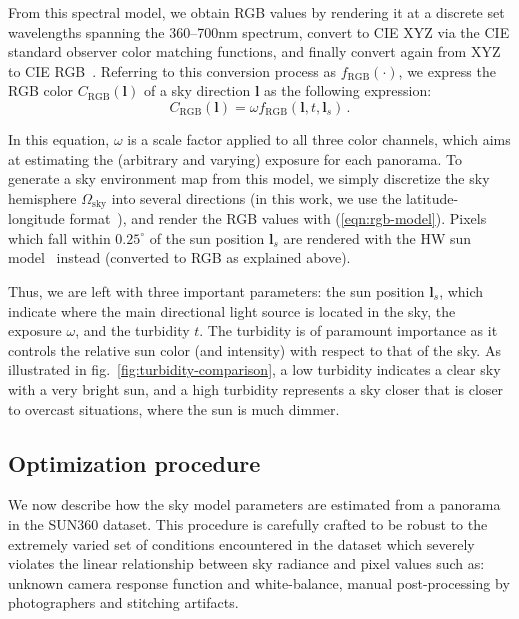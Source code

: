 From this spectral model, we obtain RGB values by rendering it at a discrete set wavelengths spanning the 360--700nm spectrum, convert to CIE XYZ via the CIE standard observer color matching functions, and finally convert again from XYZ to CIE RGB~\cite{hosek-siggraph-12}. Referring to this conversion process as $f_\text{RGB}(\cdot)$, we express the RGB color $C_\text{RGB}(\mathbf{l})$ of a sky direction $\mathbf{l}$ as the following expression:
%
\begin{equation}
C_\text{RGB}(\mathbf{l}) = \omega f_\text{RGB}(\mathbf{l}, t, \mathbf{l}_s)\,.
\label{eqn:rgb-model} 
\end{equation}
%

In this equation, $\omega$ is a scale factor applied to all three color channels, which aims at estimating the (arbitrary and varying) exposure for each panorama. To generate a sky environment map from this model, we simply discretize the sky hemisphere $\Omega_\text{sky}$ into several directions (in this work, we use the latitude-longitude format~\cite{reinhard-book-10}), and render the RGB values with (\ref{eqn:rgb-model}). Pixels which fall within $0.25^\circ$ of the sun position $\mathbf{l}_s$ are rendered with the HW sun model~\cite{hosek-cga-13} instead (converted to RGB as explained above).

Thus, we are left with three important parameters: the sun position $\mathbf{l}_s$, which indicate where the main directional light source is located in the sky, the exposure $\omega$, and the turbidity $t$. The turbidity is of paramount importance as it controls the relative sun color (and intensity) with respect to that of the sky. As illustrated in fig.~\ref{fig:turbidity-comparison}, a low turbidity indicates a clear sky with a very bright sun, and a high turbidity represents a sky closer that is closer to overcast situations, where the sun is much dimmer. 

\subsection{Optimization procedure}
\label{sec:optimization}

We now describe how the sky model parameters are estimated from a panorama in the SUN360 dataset. This procedure is carefully crafted to be robust to the extremely varied set of conditions encountered in the dataset which severely violates the linear relationship between sky radiance and pixel values such as: unknown camera response function and white-balance, manual post-processing by photographers and stitching artifacts. 

